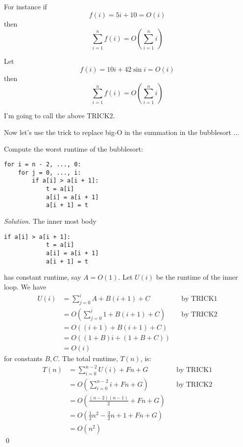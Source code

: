\begin{eg}
For instance if 
\[
f(i) = 5i + 10 = O(i)
\]
then
\[
\sum_{i=1}^n f(i) = 
O
\left(
\sum_{i=1}^n i
\right)
\]
\end{eg}

\begin{eg}
Let 
\[
f(i) = 10i + 42\sin i = O(i)
\]
then
\[
\sum_{i=1}^n f(i) = 
O
\left(
\sum_{i=1}^n i
\right)
\]
\end{eg}


I'm going to call the above TRICK2.

Now let's use the trick to replace big-O in the summation in
the bubblesort ...

\newpage

\begin{eg}
Compute the worst runtime of the bubblesort:
\begin{Verbatim}[frame=single, fontsize=\footnotesize]
for i = n - 2, ..., 0:
    for j = 0, ..., i:
        if a[i] > a[i + 1]:
            t = a[i]
            a[i] = a[i + 1]
            a[i + 1] = t
\end{Verbatim}
\end{eg}

\textit{ Solution.}
The inner most body 
\begin{Verbatim}[frame=single, fontsize=\footnotesize]
        if a[i] > a[i + 1]:
            t = a[i]
            a[i] = a[i + 1]
            a[i + 1] = t
\end{Verbatim}
has constant runtime, say $A = O(1)$.
Let $U(i)$ be the runtime of the inner loop.
We have
\begin{align*}
U(i) 
&= \sum_{j=0}^i A + B(i+1) + C & & \text{by TRICK1} \\ 
&= O \left( \sum_{j=0}^i 1 + B(i+1) + C \right) & & \text{by TRICK2}\\
&= O \left( (i + 1) + B(i + 1) + C \right) \\
&= O \left( (1+B)i + (1 + B + C) \right) \\
&= O \left( i \right)
\end{align*}
for constants $B, C$.
The total runtime, $T(n)$, is:
\begin{align*}
T(n) 
&= \sum_{i=0}^{n-2} U(i) + Fn + G & & \text{by TRICK1} \\
&= O \left( 
       \sum_{i=0}^{n-2} i + Fn + G 
     \right) & & \text{by TRICK2} \\
&= O \left(
       \frac{(n-2)(n-1)}{2} + Fn + G 
     \right) \\
&= O \left( 
       \frac{1}{2} n^2 - \frac{3}{2}n + 1  + Fn + G 
     \right) \\
&= O(n^2)
\end{align*}
\qed

